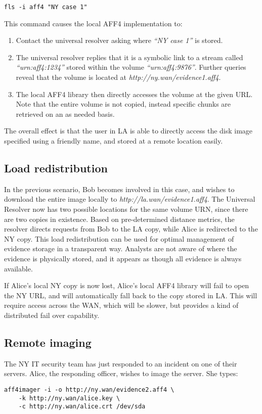 \documentclass[10pt, conference]{IEEEtran}
\begin{document}
\begin{lstlisting}
fls -i aff4 "NY case 1"
\end{lstlisting}
This command causes the local AFF4 implementation to:
\begin{enumerate}
\item Contact the universal resolver asking where \emph{``NY case 1''} is
stored.
\item The universal resolver replies that it is a symbolic link to a
stream called \emph{``urn:aff4:1234''} stored within the volume
\emph{``urn:aff4:9876''}. Further queries reveal that the volume is
located at \emph{http://ny.wan/evidence1.aff4}.
\item The local AFF4 library then directly accesses the volume at the
given URL. Note that the entire volume is not copied, instead specific
chunks are retrieved on an as needed basis.
\end{enumerate}

The overall effect is that the user in LA is able to directly access
the disk image specified using a friendly name, and stored at a remote
location easily.

\subsection{Load redistribution}
In the previous scenario, Bob becomes involved in this case, and
wishes to download the entire image locally to
\emph{http://la.wan/evidence1.aff4}. The Universal Resolver now has
two possible locations for the same volume URN, since there are two
copies in existence. Based on pre-determined distance metrics, the
resolver directs requests from Bob to the LA copy, while Alice is
redirected to the NY copy. This load redistribution can be used for
optimal management of evidence storage in a transparent way. Analysts
are not aware of where the evidence is physically stored, and it
appears as though all evidence is always available.

If Alice's local NY copy is now lost, Alice's local AFF4 library will
fail to open the NY URL, and will automatically fall back to the copy
stored in LA. This will require access across the WAN, which will be
slower, but provides a kind of distributed fail over capability.

\subsection{Remote imaging}
The NY IT security team has just responded to an incident on one of
their servers. Alice, the responding officer, wishes to image the
server. She types:
\begin{lstlisting}
aff4imager -i -o http://ny.wan/evidence2.aff4 \
	-k http://ny.wan/alice.key \
	-c http://ny.wan/alice.crt /dev/sda
\end{lstlisting}
\end{document}
